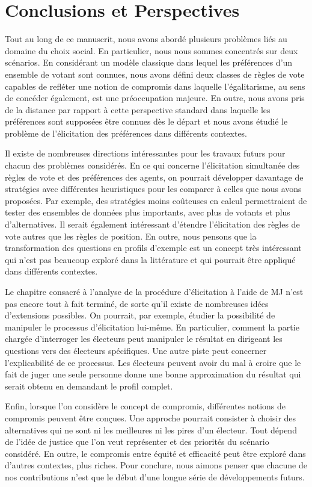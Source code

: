 \section{Conclusions et Perspectives}
	Tout au long de ce manuscrit, nous avons abordé plusieurs problèmes liés au domaine du choix social. En particulier, nous nous sommes concentrés sur deux scénarios. 
	En considérant un modèle classique dans lequel les préférences d'un ensemble de votant sont connues, nous avons défini deux classes de règles de vote capables de refléter une notion de compromis dans laquelle l'égalitarisme, au sens de concéder également, est une préoccupation majeure.
	En outre, nous avons pris de la distance par rapport à cette perspective standard dans laquelle les préférences sont supposées être connues dès le départ et nous avons étudié le problème de l'élicitation des préférences dans différents contextes.
	
	Il existe de nombreuses directions intéressantes pour les travaux futurs pour chacun des problèmes considérés.
	En ce qui concerne l'élicitation simultanée des règles de vote et des préférences des agents, on pourrait développer davantage de stratégies avec différentes heuristiques pour les comparer à celles que nous avons proposées. Par exemple, des stratégies moins coûteuses en calcul permettraient de tester des ensembles de données plus importants, avec plus de votants et plus d'alternatives. 
	Il serait également intéressant d'étendre l'élicitation des règles de vote autres que les règles de position. 
	En outre, nous pensons que la transformation des questions en profils d'exemple est un concept très intéressant qui n'est pas beaucoup exploré dans la littérature et qui pourrait être appliqué dans différents contextes. 
	
	Le chapitre consacré à l'analyse de la procédure d'élicitation à l'aide de MJ n'est pas encore tout à fait terminé, de sorte qu'il existe de nombreuses idées d'extensions possibles. On pourrait, par exemple, étudier la possibilité de manipuler le processus d'élicitation lui-même. En particulier, comment la partie chargée d'interroger les électeurs peut manipuler le résultat en dirigeant les questions vers des électeurs spécifiques. 
	Une autre piste peut concerner l'explicabilité de ce processus. Les électeurs peuvent avoir du mal à croire que le fait de juger une seule personne donne une bonne approximation du résultat qui serait obtenu en demandant le profil complet.
	
	Enfin, lorsque l'on considère le concept de compromis, différentes notions de compromis peuvent être conçues. Une approche pourrait consister à choisir des alternatives qui ne sont ni les meilleures ni les pires d'un électeur. Tout dépend de l'idée de justice que l'on veut représenter et des priorités du scénario considéré.
	En outre, le compromis entre équité et efficacité peut être exploré dans d'autres contextes, plus riches. 
	Pour conclure, nous aimons penser que chacune de nos contributions n'est que le début d'une longue série de développements futurs.
